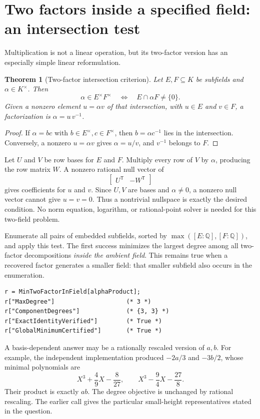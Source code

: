 \documentclass[11pt]{article}
\newcommand{\Q}{\mathbb Q}
\newcommand{\code}[1]{\texttt{\detokenize{#1}}}
\newtheorem{theorem}{Theorem}[section]
\theoremstyle{definition}\newtheorem{definition}[theorem]{Definition}
\theoremstyle{remark}\newtheorem{remark}[theorem]{Remark}
\begin{document}
\section{Two factors inside a specified field: an intersection test}
\label{sec:product}
Multiplication is not a linear operation, but its two-factor version has an
especially simple linear reformulation.

\begin{theorem}[Two-factor intersection criterion]\label{thm:intersection}
Let $E,F\subseteq K$ be subfields and $\alpha\in K^\times$. Then
\[
 \alpha\in E^\times F^\times
 \quad\Longleftrightarrow\quad E\cap\alpha F\ne\{0\}.
\]
Given a nonzero element $u=\alpha v$ of that intersection, with $u\in E$ and
$v\in F$, a factorization is $\alpha=u\,v^{-1}$.
\end{theorem}
\begin{proof}
If $\alpha=bc$ with $b\in E^\times,c\in F^\times$, then
$b=\alpha c^{-1}$ lies in the intersection. Conversely, a nonzero
$u=\alpha v$ gives $\alpha=u/v$, and $v^{-1}$ belongs to $F$.
\end{proof}

Let $U$ and $V$ be row bases for $E$ and $F$. Multiply every row of $V$ by
$\alpha$, producing the row matrix $W$. A nonzero rational null vector of
\[
 \begin{bmatrix}U^{\mathsf T}&-W^{\mathsf T}\end{bmatrix}
\]
gives coefficients for $u$ and $v$. Since $U,V$ are bases and $\alpha\ne0$,
a nonzero null vector cannot give $u=v=0$. Thus a nontrivial nullspace is
exactly the desired condition. No norm equation, logarithm, or rational-point
solver is needed for this two-field problem.

Enumerate all pairs of embedded subfields, sorted by
$\max([E:\Q],[F:\Q])$, and apply this test. The first success minimizes the
largest degree among all two-factor decompositions \emph{inside the ambient
field}. This remains true when a recovered factor generates a smaller field:
that smaller subfield also occurs in the enumeration.
\begin{lstlisting}
r = MinTwoFactorInField[alphaProduct];
r["MaxDegree"]                    (* 3 *)
r["ComponentDegrees"]             (* {3, 3} *)
r["ExactIdentityVerified"]        (* True *)
r["GlobalMinimumCertified"]       (* True *)
\end{lstlisting}
A basis-dependent answer may be a rationally rescaled version of $a,b$.
For example, the independent implementation produced $-2a/3$ and $-3b/2$,
whose minimal polynomials are
\[
 X^3+\frac49X-\frac8{27},\qquad
 X^3-\frac94X-\frac{27}{8}.
\]
Their product is exactly $ab$. The degree objective is unchanged by rational
rescaling. The earlier \code{PairFromPolynomials} call gives the particular
small-height representatives stated in the question.
\end{document}
